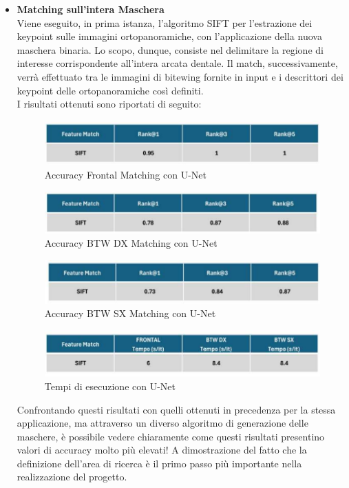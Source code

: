 \documentclass[12pt,a4paper,openright,twoside]{book}
\begin{document}
\begin{itemize}
\item \textbf{Matching sull'intera Maschera}\\
Viene eseguito, in prima istanza, l'algoritmo SIFT per l'estrazione dei keypoint sulle immagini ortopanoramiche, con l'applicazione della nuova maschera binaria. Lo scopo, dunque, consiste nel delimitare la regione di interesse corrispondente all'intera arcata dentale. Il match, successivamente, verrà effettuato tra le immagini di bitewing fornite in input e i descrittori dei keypoint delle ortopanoramiche così definiti.\\
I risultati ottenuti sono riportati di seguito:
\begin{figure}[H]
	\centering
	\includegraphics{figures/frontal4.pdf}
   	\caption{Accuracy Frontal Matching con U-Net}
	\label{fig:frontal4}
\end{figure}
\begin{figure}[H]
	\centering
	\includegraphics{figures/dx4.pdf}
    	\caption{Accuracy BTW DX Matching con U-Net}
	\label{fig:dx4}
\end{figure}
\begin{figure}[H]
	\centering
	\includegraphics{figures/sx4.pdf}
    	\caption{Accuracy BTW SX Matching con U-Net}
	\label{fig:sx4}
\end{figure}
\begin{figure}[H]
	\centering
	\includegraphics{figures/tempi4.pdf}
    	\caption{Tempi di esecuzione con U-Net}
	\label{fig:tempi4}
\end{figure}
Confrontando questi risultati con quelli ottenuti in precedenza per la stessa applicazione, ma attraverso un diverso algoritmo di generazione delle maschere, è possibile vedere chiaramente come questi risultati presentino valori di accuracy molto più elevati! A dimostrazione del fatto che la definizione dell'area di ricerca è il primo passo più importante nella realizzazione del progetto.


\end{itemize}
\end{document}

